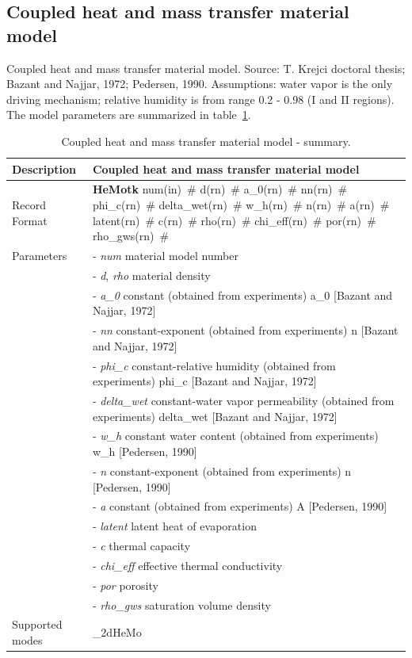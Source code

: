 \documentclass[a4paper]{article}
\newcommand{\descitem}[1]{{\noindent \bf #1}}
\newcommand{\elemparam}[2]{{{#1\tiny (#2)}~\#}}
\newcommand{\param}[1]{{\it #1}}
\begin{document}
\subsection{Coupled heat and mass transfer material model}
Coupled heat and mass transfer material model.
Source: T. Krejci doctoral thesis; Bazant and Najjar, 1972;
Pedersen, 1990. Assumptions: water vapor is the only driving
mechanism; relative humidity is from range 0.2 - 0.98 (I and II
regions). The model parameters are summarized
in table~\ref{hemotk_table}.
\begin{table}[!htb]
\begin{tabular}{|l|p{9cm}|}
\hline
Description & Coupled heat and mass transfer material model\\
\hline
Record Format & \descitem{HeMotk} \elemparam{num}{in}
\elemparam{d}{rn} \elemparam{a\_0}{rn} \elemparam{nn}{rn}
\elemparam{phi\_c}{rn} \elemparam{delta\_wet}{rn}
\elemparam{w\_h}{rn} \elemparam{n}{rn}
\elemparam{a}{rn} \elemparam{latent}{rn}
\elemparam{c}{rn} \elemparam{rho}{rn}
\elemparam{chi\_eff}{rn} \elemparam{por}{rn}
\elemparam{rho\_gws}{rn}\\
Parameters &- \param{num} material model number\\
&- \param{d}, \param{rho} material density\\
&- \param{a\_0} constant (obtained from experiments) a\_0 [Bazant and Najjar, 1972]\\
&- \param{nn} constant-exponent (obtained from experiments) n [Bazant
and Najjar, 1972]\\
&- \param{phi\_c} constant-relative humidity  (obtained from experiments) phi\_c [Bazant and Najjar, 1972]\\
&- \param{delta\_wet} constant-water vapor permeability (obtained from
experiments) delta\_wet [Bazant and Najjar, 1972]\\
&- \param{w\_h} constant water content (obtained from experiments) w\_h
[Pedersen, 1990]\\
&- \param{n} constant-exponent (obtained from experiments) n [Pedersen, 1990]\\
&- \param{a} constant (obtained from experiments) A [Pedersen, 1990]\\
&- \param{latent} latent heat of evaporation\\
&- \param{c} thermal capacity\\
&- \param{chi\_eff} effective thermal conductivity\\
&- \param{por} porosity\\
&- \param{rho\_gws} saturation volume density\\
Supported modes& \_2dHeMo\\
\hline
\end{tabular}
\caption{Coupled heat and mass transfer material model - summary.}
\label{hemotk_table}
\end{table}
\end{document}
